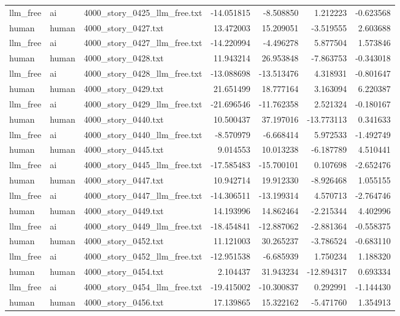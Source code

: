 \begin{longtable}{lllrrrr}
llm\_free & ai & 4000\_story\_0425\_llm\_free.txt & -14.051815 & -8.508850 & 1.212223 & -0.623568 \\
human & human & 4000\_story\_0427.txt & 13.472003 & 15.209051 & -3.519555 & 2.603688 \\
llm\_free & ai & 4000\_story\_0427\_llm\_free.txt & -14.220994 & -4.496278 & 5.877504 & 1.573846 \\
human & human & 4000\_story\_0428.txt & 11.943214 & 26.953848 & -7.863753 & -0.343018 \\
llm\_free & ai & 4000\_story\_0428\_llm\_free.txt & -13.088698 & -13.513476 & 4.318931 & -0.801647 \\
human & human & 4000\_story\_0429.txt & 21.651499 & 18.777164 & 3.163094 & 6.220387 \\
llm\_free & ai & 4000\_story\_0429\_llm\_free.txt & -21.696546 & -11.762358 & 2.521324 & -0.180167 \\
human & human & 4000\_story\_0440.txt & 10.500437 & 37.197016 & -13.773113 & 0.341633 \\
llm\_free & ai & 4000\_story\_0440\_llm\_free.txt & -8.570979 & -6.668414 & 5.972533 & -1.492749 \\
human & human & 4000\_story\_0445.txt & 9.014553 & 10.013238 & -6.187789 & 4.510441 \\
llm\_free & ai & 4000\_story\_0445\_llm\_free.txt & -17.585483 & -15.700101 & 0.107698 & -2.652476 \\
human & human & 4000\_story\_0447.txt & 10.942714 & 19.912330 & -8.926468 & 1.055155 \\
llm\_free & ai & 4000\_story\_0447\_llm\_free.txt & -14.306511 & -13.199314 & 4.570713 & -2.764746 \\
human & human & 4000\_story\_0449.txt & 14.193996 & 14.862464 & -2.215344 & 4.402996 \\
llm\_free & ai & 4000\_story\_0449\_llm\_free.txt & -18.454841 & -12.887062 & -2.881364 & -0.558375 \\
human & human & 4000\_story\_0452.txt & 11.121003 & 30.265237 & -3.786524 & -0.683110 \\
llm\_free & ai & 4000\_story\_0452\_llm\_free.txt & -12.951538 & -6.685939 & 1.750234 & 1.188320 \\
human & human & 4000\_story\_0454.txt & 2.104437 & 31.943234 & -12.894317 & 0.693334 \\
llm\_free & ai & 4000\_story\_0454\_llm\_free.txt & -19.415002 & -10.300837 & 0.292991 & -1.144430 \\
human & human & 4000\_story\_0456.txt & 17.139865 & 15.322162 & -5.471760 & 1.354913 \\

\end{longtable}
